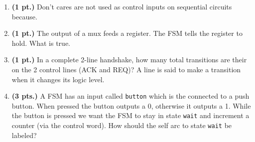 \documentclass{article}
\begin{document}
\begin{enumerate}
\pagebreak
\item{\bf(1 pt.)} Don't cares are not used as control inputs on sequential
circuits because.

\item{\bf(1 pt.)} The output of a mux feeds a register.  The FSM tells the
register to hold.  What is true.

\item{\bf(1 pt.)} In a complete 2-line handshake, how many total transitions 
are their on the 2 control lines (ACK and REQ)?  A line is said to make a 
transition when it changes its logic level.

\item {\bf (3 pts.)} 
A FSM has an input called \verb+button+ which is the connected to 
a push button.  When pressed the button outputs a 0, 
otherwise it outputs a 1.  While the button is pressed we want 
the FSM to stay in state \verb+wait+ and increment a counter 
(via the control word).  How should the self arc to state 
\verb+wait+ be labeled?


\end{enumerate}
\end{document}
